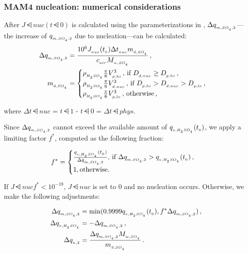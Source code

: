 \subsubsection{MAM4 nucleation: numerical considerations}

After $J\dsub{nuc}(t\dsub{0})$ is calculated using the parameterizations in
, $\Delta q_{_{m,SO_{_4},2}}$---the increase of
$q_{_{m,SO_{_4},2}}$ due to nucleation---can be calculated:
%
\begin{align}
  \Delta q_{_{m,SO_{_4},2}} &= \frac{10^6 J_{_{nuc}}(t_{_{0}}) \Delta t_{_{nuc}} m_{_{d,SO_{_4}}}}
                            {c_{_{air}}M_{_{w,SO_{_4}}}} \,, \\
  m_{_{d,SO_{_4}}} &= \begin{cases}
    \rho_{_{H_{_2}SO_{_4}}} \frac{\pi}{6}V_{_{p,hi}}^3 \,, \, \text{if $D_{_{d,nuc}} \ge D_{_{p,hi}}$} \,, \\
    \rho_{_{H_{_2}SO_{_4}}} \frac{\pi}{6}V_{_{d,nuc}}^3 \,, \, \text{if $D_{_{p,hi}} > D_{_{d,nuc}} > D_{_{p,lo}}$} \,, \\
    \rho_{_{H_{_2}SO_{_4}}} \frac{\pi}{6}V_{_{p,lo}}^3 \,, \, \text{otherwise} \,,
  \end{cases}
\end{align}

where $\Delta t\dsub{nuc}$ = $t\dsub{1}$ - $t\dsub{0}$ = $\Delta t\dsub{phys}$.

Since $\Delta q_{_{m,SO_{_4},2}}$ cannot exceed the available amount of
$q_{_{v,H_{_2}SO_{_4}}}(t_{_{0}})$, we apply a limiting factor $f^*$, computed
as the following fraction:

\begin{equation}
  f^* = \begin{cases}
        \frac{q_{_{v,H_{_2}SO_{_4}}}(t_{_{0}})}{\Delta q_{_{m,SO_{_4},2}}}, \, \text{if $\Delta q_{_{m,SO_{_4},2}} > q_{_{v,H_{_2}SO_{_4}}}(t_{_{0}})$} \,, \\
        1, \text{otherwise.} \\
  \end{cases}
\end{equation}

If $J\dsub{nuc} f^* < 10^{-18}$, $J\dsub{nuc}$ is set to $0$ and no nucleation
occurs. Otherwise, we make the following adjustments:

\begin{align}
  \Delta q_{_{m,SO_{_4},2}} &= \min ( 0.9999q_{_{v,H_{_2}SO_{_4}}}(t_{_{0}}), f^* \Delta q_{_{m,SO_{_4},2}} ) \,, \\
  \Delta q_{_{v,H_{_2}SO_{_4}}} &= - \Delta q_{_{m,SO_{_4},2}} \,, \\
  \Delta q_{_{n,2}} &= \frac{\Delta q_{_{m,SO_{_4},2}} M_{_{w,SO_{_4}}}}{m_{_{d,SO_{_4}}}} \,.
\end{align}

